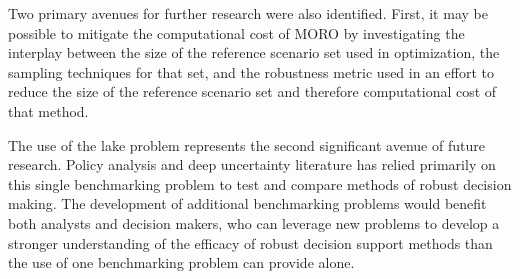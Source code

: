 Two primary avenues for further research were also identified. First, it may be possible to mitigate the computational cost of MORO by investigating the interplay between the size of the reference scenario set used in optimization, the sampling techniques for that set, and the robustness metric used in an effort to reduce the size of the reference scenario set and therefore computational cost of that method. 

The use of the lake problem represents the second significant avenue of future research. Policy analysis and deep uncertainty literature has relied primarily on this single benchmarking problem to test and compare methods of robust decision making. The development of additional benchmarking problems would benefit both analysts and decision makers, who can leverage new problems to develop a stronger understanding of the efficacy of robust decision support methods than the use of one benchmarking problem can provide alone. 





